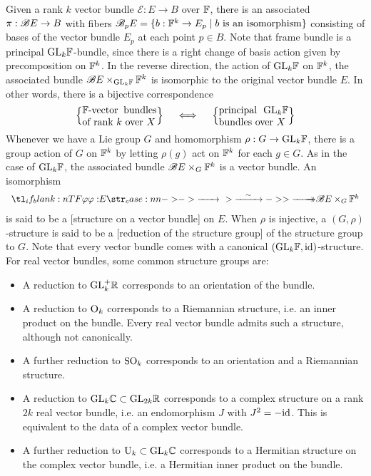 Given a rank $k$ vector bundle $\mathcal{E} : E \to B$ over $\mathbb{F}$, there is an associated  $\pi : \mathscr{B} E \to B$ with fibers $\mathscr{B}_p E = \{ b : \mathbb{F}^k \to E_p \mid b\textrm{ is an isomorphism}\}$ consisting of bases of the vector bundle $E_p$ at each point $p\in B$. Note that frame bundle is a principal $\mathrm{GL}_k\mathbb{F}$-bundle, since there is a right change of basis action given by precomposition on $\mathbb{F}^k$.
In the reverse direction, the action of $\mathrm{GL}_k\mathbb{F}$ on $\mathbb{F}^k$, the associated bundle $\mathscr{B} E\times_{\mathrm{GL}_k\mathbb{F}} \mathbb{F}^k$ is isomorphic to the original vector bundle $E$. In other words, there is a bijective correspondence
\begin{equation}\label{eq:principal-GL-bundle-vector-bundle}
	\left\{\parbox{7.5em}{$\F$-vector bundles of rank $k$ over $X$}\right\}
	\quad\iff\quad
	\left\{\parbox{7em}{principal $\GL_k\F$ bundles over $X$}\right\}
\end{equation}
Whenever we have a Lie group $G$ and homomorphism $\rho : G \to \mathrm{GL}_k\mathbb{F}$, there is a group action of $G$ on $\mathbb{F}^k$ by letting $\rho(g)$ act on $\mathbb{F}^k$ for each $g\in G$. As in the case of $\mathrm{GL}_k \mathbb{F}$, the associated bundle $\mathscr{B} E\times_G \mathbb{F}^k$ is a vector bundle. An isomorphism
\begin{equation}\label{eq:structure-on-a-vector-bundle}
	\lkxfunc{\varphi}{E}{\B E\times_G \F^k}
\end{equation}
is said to be a [structure on a vector bundle] on $E$. When $\rho$ is injective, a $(G,\rho)$-structure is said to be a [reduction of the structure group] of the structure group to $G$.
Note that every vector bundle comes with a canonical $(\mathrm{GL}_k \mathbb{F}, \mathrm{id})$-structure.
For real vector bundles, some common structure groups are:
\begin{itemize}
	\item A reduction to $\mathrm{GL}^+_k\mathbb{R}$ corresponds to an orientation of the bundle.
	\item A reduction to $\mathrm{O}_k$ corresponds to a Riemannian structure, i.e. an inner product on the bundle. Every real vector bundle admits such a structure, although not canonically.
	\item A further reduction to $\mathrm{SO}_k$ corresponds to an orientation and a Riemannian structure.
	\item A reduction to $\mathrm{GL}_{k}\mathbb{C}\subset \mathrm{GL}_{2k}\mathbb{R}$ corresponds to a complex structure on a rank $2k$ real vector bundle, i.e. an endomorphism $J$ with $J^2=-\mathrm{id}$. This is equivalent to the data of a complex vector bundle.
	\item A further reduction to $\mathrm{U}_k\subset \mathrm{GL}_k\mathbb{C}$ corresponds to a Hermitian structure on the complex vector bundle, i.e. a Hermitian inner product on the bundle.
\end{itemize}

